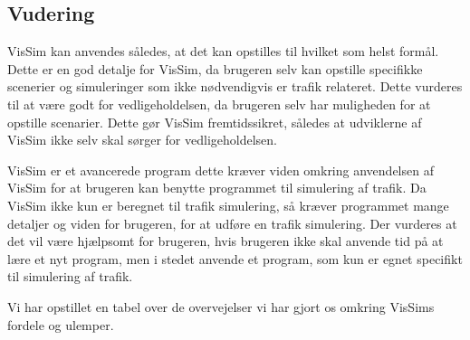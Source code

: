 \begin{figure}[H]
\caption{}\label{GrafForDecelerationVisSimGPS}
\end{figure}

\subsection*{Vudering}
VisSim kan anvendes således, at det kan opstilles til hvilket som helst formål. Dette er en god detalje for VisSim, da brugeren selv kan opstille specifikke scenerier og simuleringer som ikke nødvendigvis er trafik relateret. Dette vurderes til at være godt for vedligeholdelsen, da brugeren selv har muligheden for at opstille scenarier. Dette gør VisSim fremtidssikret, således at udviklerne af VisSim ikke selv skal sørger for vedligeholdelsen.

VisSim er et avancerede program dette kræver viden omkring anvendelsen af VisSim for at brugeren kan benytte programmet til simulering af trafik. Da VisSim ikke kun er beregnet til trafik simulering, så kræver programmet mange detaljer og viden for brugeren, for at udføre en trafik simulering. Der vurderes at det vil være hjælpsomt for brugeren, hvis brugeren ikke skal anvende tid på at lære et nyt program, men i stedet anvende et program, som kun er egnet specifikt til simulering af trafik. 

Vi har opstillet en tabel over de overvejelser vi har gjort os omkring VisSims fordele og ulemper.



